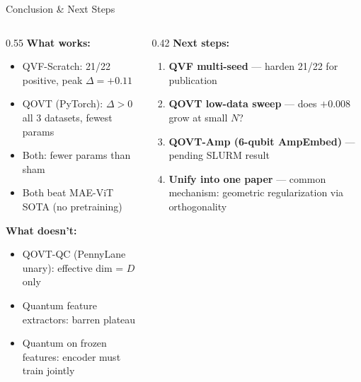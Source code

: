 \documentclass[aspectratio=169]{beamer}
\newcommand{\win}[1]{\textcolor{good}{\textbf{#1}}}
\newcommand{\lose}[1]{\textcolor{bad}{#1}}
\begin{document}
\begin{frame}{Conclusion \& Next Steps}

\begin{columns}
\begin{column}{0.55\textwidth}
\textbf{What works:}
\begin{itemize}
  \item[\win{$\checkmark$}] QVF-Scratch: 21/22 positive, peak $\Delta=+0.11$
  \item[\win{$\checkmark$}] QOVT (PyTorch): $\Delta>0$ all 3 datasets, fewest params
  \item[\win{$\checkmark$}] Both: fewer params than sham
  \item[\win{$\checkmark$}] Both beat MAE-ViT SOTA (no pretraining)
\end{itemize}

\medskip
\textbf{What doesn't:}
\begin{itemize}
  \item[\lose{$\times$}] QOVT-QC (PennyLane unary): effective dim = $D$ only
  \item[\lose{$\times$}] Quantum feature extractors: barren plateau
  \item[\lose{$\times$}] Quantum on frozen features: encoder must train jointly
\end{itemize}
\end{column}
\begin{column}{0.42\textwidth}
\textbf{Next steps:}
\begin{enumerate}
  \item \textbf{QVF multi-seed} --- harden 21/22 for publication
  \item \textbf{QOVT low-data sweep} --- does $+0.008$ grow at small $N$?
  \item \textbf{QOVT-Amp (6-qubit AmpEmbed)} --- pending SLURM result
  \item \textbf{Unify into one paper} --- common mechanism: geometric regularization via orthogonality
\end{enumerate}
\end{column}
\end{columns}
\end{frame}
\end{document}

